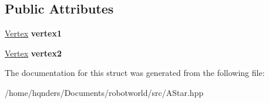 \subsection*{Public Attributes}
\begin{DoxyCompactItemize}
\item 
\hyperlink{struct_path_algorithm_1_1_vertex}{Vertex} {\bfseries vertex1}\hypertarget{struct_path_algorithm_1_1_edge_ab655d5ef6c7022bc87520c4e751b4dcf}{}\label{struct_path_algorithm_1_1_edge_ab655d5ef6c7022bc87520c4e751b4dcf}

\item 
\hyperlink{struct_path_algorithm_1_1_vertex}{Vertex} {\bfseries vertex2}\hypertarget{struct_path_algorithm_1_1_edge_ab8d28fabc8b10986f4e4d915f0b6f16a}{}\label{struct_path_algorithm_1_1_edge_ab8d28fabc8b10986f4e4d915f0b6f16a}

\end{DoxyCompactItemize}


The documentation for this struct was generated from the following file\+:\begin{DoxyCompactItemize}
\item 
/home/hqnders/\+Documents/robotworld/src/A\+Star.\+hpp\end{DoxyCompactItemize}
